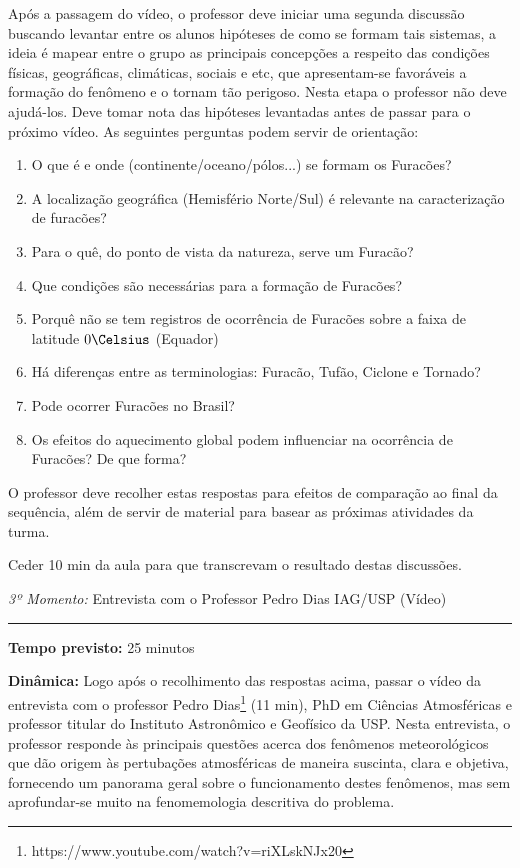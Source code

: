 Após a passagem do vídeo, o professor deve iniciar uma segunda discussão buscando levantar entre os alunos hipóteses de como se formam tais sistemas, a ideia é  mapear entre o grupo as principais concepções a respeito das condições físicas, geográficas, climáticas, sociais e etc, que apresentam-se favoráveis a formação do fenômeno e o tornam tão perigoso. Nesta etapa o professor não deve ajudá-los. Deve tomar nota das hipóteses levantadas antes de passar para o próximo vídeo. As seguintes perguntas podem servir de orientação:

\begin{enumerate}[label=\alph *)]
		\item O que é e onde (continente/oceano/pólos...) se formam os Furacões?
		\item A localização geográfica (Hemisfério Norte/Sul) é relevante na caracterização de furacões?
		\item Para o quê, do ponto de vista da natureza, serve um Furacão?
		\item Que condições são necessárias para a formação de Furacões?
		\item Porquê não se tem registros de ocorrência de Furacões sobre a faixa de latitude $0\Celsius$ (Equador)
		\item Há diferenças entre as terminologias: Furacão, Tufão, Ciclone e Tornado?
		\item Pode ocorrer Furacões no Brasil?
		\item Os efeitos do aquecimento global podem influenciar na ocorrência de Furacões? De que forma? 
\end{enumerate}

O professor deve recolher estas respostas para efeitos de comparação ao final da sequência, além de servir de material para basear as próximas atividades da turma. 

Ceder 10 min da aula para que transcrevam o resultado destas discussões.


\vspace{50pt}
\noindent\emph{3º Momento:} Entrevista com o Professor Pedro Dias IAG/USP (Vídeo)
\par\noindent\rule{.3\textwidth}{.5pt}
\par\noindent\textbf{Tempo previsto:} 25 minutos
\par\noindent\textbf{Dinâmica:} Logo após o recolhimento das respostas acima, passar o vídeo da entrevista com o professor Pedro Dias\footnote{https://www.youtube.com/watch?v=riXLskNJx20} (11 min), PhD em Ciências Atmosféricas e professor titular do Instituto Astronômico e Geofísico da USP. Nesta entrevista, o professor responde às principais questões acerca dos fenômenos meteorológicos que dão origem às pertubações atmosféricas de maneira suscinta, clara e objetiva, fornecendo um panorama geral sobre o funcionamento destes fenômenos, mas sem aprofundar-se muito na fenomemologia descritiva do problema.

